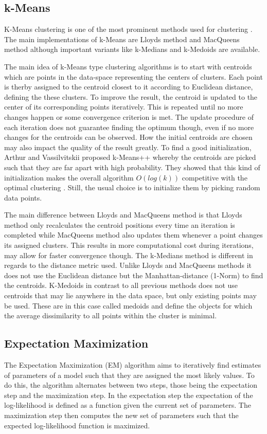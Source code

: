 \documentclass[
	a4paper,
	english,
	twoside,
	openright,               
	11pt                            
	]{report}
\begin{document}
\subsection{k-Means}
K-Means clustering is one of the most prominent methods used for clustering \cite{Jin2010}. The main implementations of k-Means are Lloyds method \cite{4031353} and MacQueens method \cite{macqueen1967} although important variants like k-Medians \cite{Dohan2015KmedianAT} and k-Medoids \cite{kmedoids}  are available.

The main idea of k-Means type clustering algorithms is to start with centroids which are points in the data-space representing the centers of clusters. Each point is therby assigned to the centroid closest to it according to Euclidean distance, defining the these clusters. To improve the result, the centroid is updated to the center of its corresponding points iteratively. This is repeated until no more changes happen or some convergence criterion is met. The update procedure of each iteration does not guarantee finding the optimum though, even if no more changes for the centroids can be observed. How the initial centroids are chosen may also impact the quality of the result greatly. To find a good initialization, Arthur and Vassilvitskii \cite{10.5555/1283383.1283494} proposed k-Means++ whereby the centroids are picked such that they are far apart with high probability. They showed that this kind of initialization makes the overall algorithm $O(log(k))$ competitive with the optimal clustering \cite{10.5555/1283383.1283494}. Still, the usual choice is to initialize them by picking random data points.

The main difference between Lloyds and MacQueens method is that Lloyds method only recalculates the centroid positions every time an iteration is completed while MacQueens method also updates them whenever a point changes its assigned clusters. This results in more computational cost during iterations, may allow for faster convergence though. The k-Medians method is different in regards to the distance metric used. Unlike Lloyds and MacQueens methods it does not use the Euclidean distance but the Manhattan-distance (1-Norm) to find the centroids. K-Medoids in contrast to all previous methods does not use centroids that may lie anywhere in the data space, but only existing points may be used. These are in this case called medoids and define the objects for which the average dissimilarity to all points within the cluster is minimal.

\subsection{Expectation Maximization}
The Expectation Maximization (EM) algorithm \cite{10.2307/2984875} aims to iteratively find estimates of parameters of a model such that they are assigned the most likely values. To do this, the algorithm alternates between two steps, those being the expectation step and the maximization step. In the expectation step the expectation of the log-likelihood is defined as a function given the current set of parameters. The maximization step then computes the new set of parameters such that the expected log-likelihood function is maximized.
\end{document}
